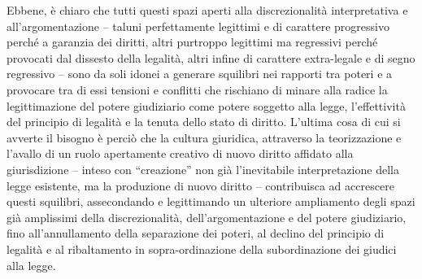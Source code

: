 Ebbene, è chiaro che tutti questi spazi aperti alla discrezionalità interpretativa e all’argomentazione – taluni perfettamente legittimi e di carattere progressivo perché a garanzia dei diritti, altri purtroppo legittimi ma regressivi perché provocati dal dissesto della legalità, altri infine di carattere extra-legale e di segno regressivo – sono da soli idonei a generare squilibri nei rapporti tra poteri e a provocare tra di essi tensioni e conflitti che rischiano di minare alla radice la legittimazione del potere giudiziario come potere soggetto alla legge, l’effettività del principio di legalità e la tenuta dello stato di diritto. L’ultima cosa di cui si avverte il bisogno è perciò che la cultura giuridica, attraverso la teorizzazione e l’avallo di un ruolo apertamente creativo di nuovo diritto affidato alla giurisdizione – inteso con “creazione” non già l’inevitabile interpretazione della legge esistente, ma la produzione di nuovo diritto – contribuisca ad accrescere questi squilibri, assecondando e legittimando un ulteriore ampliamento degli spazi già amplissimi della discrezionalità, dell’argomentazione e del potere giudiziario, fino all’annullamento della separazione dei poteri, al declino del principio di legalità e al ribaltamento in sopra-ordinazione della subordinazione dei giudici alla legge.

